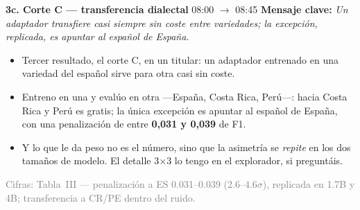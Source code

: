 \documentclass[11pt,a4paper]{article}
\newcommand{\clave}[1]{\noindent\textbf{Mensaje clave:} \emph{#1}\par\smallskip}
\newcommand{\visual}[1]{\noindent{\footnotesize\textcolor{teal!60!black}{$\square$~[apoyo visual]: #1}}\par\smallskip}
\newcommand{\fuente}[1]{\par{\footnotesize\textcolor{gray}{Cifras: #1}}\par}
\newenvironment{decir}{\begin{itemize}[label=\textbf{--},leftmargin=1.3em,itemsep=2.5pt,topsep=3pt]}{\end{itemize}}
\begin{document}
\medskip\noindent\textbf{3c. Corte C --- transferencia dialectal} \hfill {\small 08:00 $\rightarrow$ 08:45}
\clave{Un adaptador transfiere casi siempre sin coste entre variedades; la excepción, replicada, es apuntar al español de España.}
\visual{Figura C: los dos heatmaps 3$\times$3 (1.7B y 4B), diagonal resaltada. (Detalle 3$\times$3 $\rightarrow$ explorador, Vista~3, en Q\&A.)}
\begin{decir}
  \item Tercer resultado, el corte C, en un titular: un adaptador entrenado en una variedad del español sirve para otra casi sin coste.
  \item Entreno en una y evalúo en otra ---España, Costa Rica, Perú---: hacia Costa Rica y Perú es gratis; la única excepción es apuntar al español de España, con una penalización de entre \textbf{0,031 y 0,039} de F1.
  \item Y lo que le da peso no es el número, sino que la asimetría se \emph{repite} en los dos tamaños de modelo. El detalle 3$\times$3 lo tengo en el explorador, si preguntáis.
\end{decir}
\fuente{Tabla~III --- penalización a ES 0.031--0.039 (2.6--4.6$\sigma$), replicada en 1.7B y 4B; transferencia a CR/PE dentro del ruido.}
\end{document}

